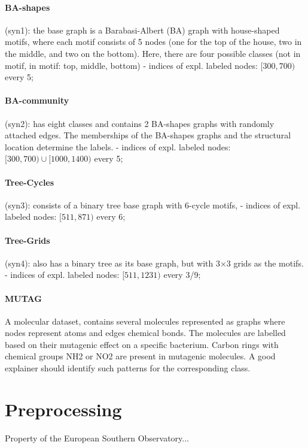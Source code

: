 \documentclass[binding=0.6cm]{sapthesis}
\begin{document}
\paragraph{BA-shapes}
(syn1): the base graph is a Barabasi-Albert (BA) graph with house-shaped motifs, where each motif consists of 5 nodes (one for the top of the house, two in the middle, and two on the bottom). Here, there are four possible classes (not in motif, in motif: top, middle, bottom)  - indices of expl. labeled nodes: $[300,700)$ every 5;

\paragraph{BA-community}
(syn2): has eight classes and contains 2 BA-shapes graphs with randomly attached edges. The memberships of the BA-shapes graphs and the structural location determine the labels.  - indices of expl. labeled nodes: $[300,700) \cup [1000,1400)$ every 5; 

\paragraph{Tree-Cycles}
(syn3): consists of a binary tree base graph with 6-cycle motifs,  - indices of expl. labeled nodes: $[511,871)$ every 6;

\paragraph{Tree-Grids}
(syn4): also has a binary tree as its base graph, but with 3×3 grids as the motifs.  - indices of expl. labeled nodes: $[511,1231)$ every 3/9;

\paragraph{MUTAG}
A molecular dataset, contains several molecules represented as graphs where nodes represent atoms and edges chemical bonds. The molecules are labelled based on their mutagenic effect on a specific bacterium. Carbon rings with chemical groups NH2 or NO2 are present in mutagenic molecules. A good explainer should identify such patterns for the corresponding class.


\section{Preprocessing}
\label{sec:expRes.preprocessing}
Property of the European Southern Observatory...
\end{document}
